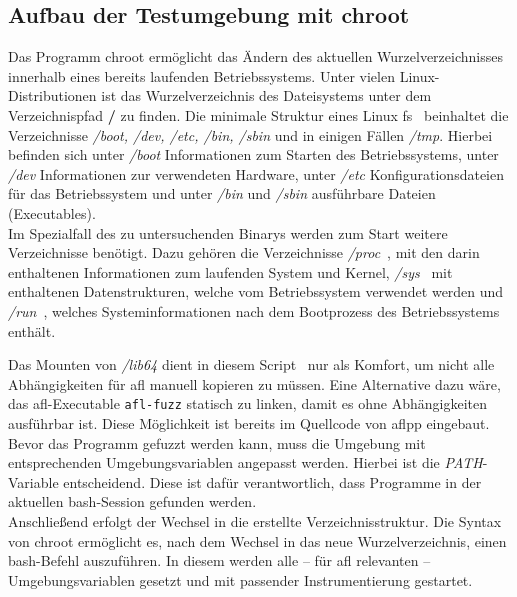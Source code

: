 
\subsection{Aufbau der Testumgebung mit chroot}\label{subsec: chroot}
Das Programm chroot ermöglicht das Ändern des aktuellen Wurzelverzeichnisses innerhalb eines bereits laufenden Betriebssystems.
Unter vielen Linux-Distributionen ist das Wurzelverzeichnis des Dateisystems unter dem Verzeichnispfad \textbf{/} zu finden.
Die minimale Struktur eines Linux \gls{fs}~\cite{root-fs} beinhaltet die Verzeichnisse \textit{/boot, /dev, /etc, /bin, /sbin}
und in einigen Fällen \textit{/tmp}.
Hierbei befinden sich unter \textit{/boot} Informationen zum Starten des Betriebssystems, unter \textit{/dev} Informationen zur verwendeten Hardware,
unter \textit{/etc} Konfigurationsdateien für das Betriebssystem und unter \textit{/bin} und \textit{/sbin} ausführbare Dateien (Executables). \\
Im Spezialfall des zu untersuchenden Binarys werden zum Start weitere Verzeichnisse benötigt.
Dazu gehören die Verzeichnisse \textit{/proc}~\cite{arch-procfs}, mit den darin enthaltenen Informationen zum laufenden System und Kernel,
\textit{/sys}~\cite{kernel-sysfs} mit enthaltenen Datenstrukturen, welche vom Betriebssystem verwendet werden
und \textit{/run}~\cite{runfs}, welches Systeminformationen nach dem Bootprozess des Betriebssystems enthält.

Das Mounten von \textit{/lib64} dient in diesem Script~\cite{chroot-fuzz} nur als Komfort, um nicht alle Abhängigkeiten für
\gls{afl} manuell kopieren zu müssen.
Eine Alternative dazu wäre, das \gls{afl}-Executable \texttt{afl-fuzz} statisch zu linken, damit es ohne Abhängigkeiten
ausführbar ist.
Diese Möglichkeit ist bereits im Quellcode von \gls{aflpp} eingebaut.\\
Bevor das Programm gefuzzt werden kann, muss die Umgebung mit entsprechenden Umgebungsvariablen angepasst werden.
Hierbei ist die \textit{PATH}-Variable entscheidend.
Diese ist dafür verantwortlich, dass Programme in der aktuellen \gls{bash}-Session gefunden werden.\\
Anschließend erfolgt der Wechsel in die erstellte Verzeichnisstruktur.
Die Syntax von chroot ermöglicht es, nach dem Wechsel in das neue Wurzelverzeichnis, einen \gls{bash}-Befehl auszuführen.
In diesem werden alle -- für \gls{afl} relevanten -- Umgebungsvariablen gesetzt und mit passender Instrumentierung gestartet.


